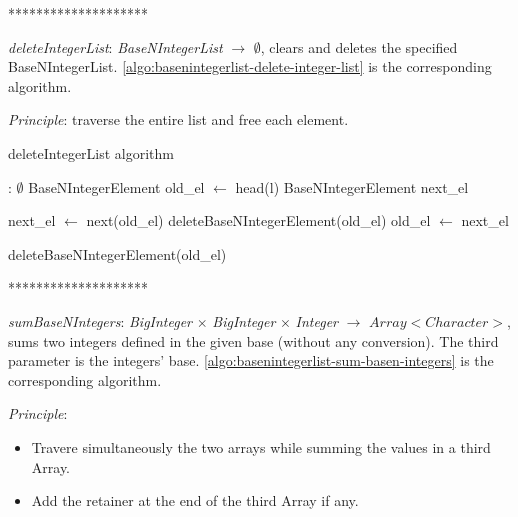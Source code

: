 \documentclass[book, nodocumentinfo]{upmethodology-document}
\newcommand{\separator}{\centerline{********************}}
\begin{document}
\separator

\emph{deleteIntegerList}: \emph{BaseNIntegerList} \(\rightarrow\) \(\emptyset\),
clears and deletes the specified BaseNIntegerList.
\ref{algo:basenintegerlist-delete-integer-list} is the corresponding algorithm.

\emph{Principle}: traverse the entire list and free each element.

\begin{algorithm}[H]
    \caption{deleteIntegerList algorithm}
    \label{algo:basenintegerlist-delete-integer-list}

    \begin{algorithmic}
         : \(\emptyset\)
                \State BaseNIntegerElement old\_el \(\leftarrow\) head(l)
                \State BaseNIntegerElement next\_el

                    \State next\_el \(\leftarrow\) next(old\_el)
                    \State deleteBaseNIntegerElement(old\_el)
                    \State old\_el \(\leftarrow\) next\_el
                \EndWhile

                \State deleteBaseNIntegerElement(old\_el)
            \EndIf
        \EndFunction
    \end{algorithmic}
\end{algorithm}

\separator

\emph{sumBaseNIntegers}: \emph{BigInteger} \(×\) \emph{BigInteger} \(×\) \emph{Integer} \(\rightarrow\) \emph{\(Array<Character>\)},
sums two integers defined in the given base (without any conversion).
The third parameter is the integers' base.
\ref{algo:basenintegerlist-sum-basen-integers} is the corresponding algorithm.

\emph{Principle}:
\begin{itemize}
    \item Travere simultaneously the two arrays while summing the values in a third Array.
    \item Add the retainer at the end of the third Array if any.
\end{itemize}

\newpage
\end{document}
